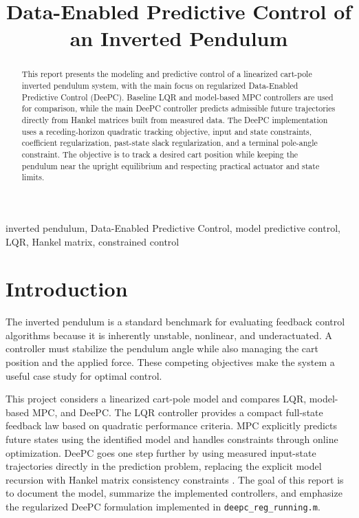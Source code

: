 \documentclass[conference]{IEEEtran}
\title{Data-Enabled Predictive Control of an Inverted Pendulum}
\author{
\IEEEauthorblockN{Your Name}
\IEEEauthorblockA{
Department of Electrical and Computer Engineering\\
The University of Texas at Dallas\\
Richardson, TX, USA\\
Email: your.email@utdallas.edu}
}
\begin{document}
\maketitle

\begin{abstract}
This report presents the modeling and predictive control of a linearized cart-pole inverted pendulum system, with the main focus on regularized Data-Enabled Predictive Control (DeePC). Baseline LQR and model-based MPC controllers are used for comparison, while the main DeePC controller predicts admissible future trajectories directly from Hankel matrices built from measured data. The DeePC implementation uses a receding-horizon quadratic tracking objective, input and state constraints, coefficient regularization, past-state slack regularization, and a terminal pole-angle constraint. The objective is to track a desired cart position while keeping the pendulum near the upright equilibrium and respecting practical actuator and state limits.
\end{abstract}

\begin{IEEEkeywords}
inverted pendulum, Data-Enabled Predictive Control, model predictive control, LQR, Hankel matrix, constrained control
\end{IEEEkeywords}

\section{Introduction}
The inverted pendulum is a standard benchmark for evaluating feedback control algorithms because it is inherently unstable, nonlinear, and underactuated. A controller must stabilize the pendulum angle while also managing the cart position and the applied force. These competing objectives make the system a useful case study for optimal control.

This project considers a linearized cart-pole model and compares LQR, model-based MPC, and DeePC. The LQR controller provides a compact full-state feedback law based on quadratic performance criteria. MPC explicitly predicts future states using the identified model and handles constraints through online optimization. DeePC goes one step further by using measured input-state trajectories directly in the prediction problem, replacing the explicit model recursion with Hankel matrix consistency constraints \cite{coulson2019deepc}. The goal of this report is to document the model, summarize the implemented controllers, and emphasize the regularized DeePC formulation implemented in \texttt{deepc\_reg\_running.m}.
\end{document}
